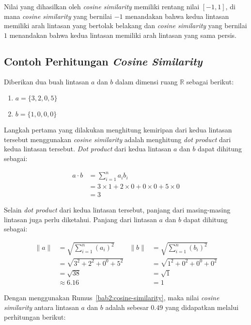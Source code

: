 Nilai yang dihasilkan oleh \textit{cosine similarity} memiliki rentang nilai $[-1, 1]$, di mana \textit{cosine similarity} yang bernilai $-1$ menandakan bahwa kedua lintasan memiliki arah lintasan yang bertolak belakang dan \textit{cosine similarity} yang bernilai $1$ menandakan bahwa kedua lintasan memiliki arah lintasan yang sama persis.

\subsection{Contoh Perhitungan \textit{Cosine Similarity}}
\label{subsec:contoh-cosine}

Diberikan dua buah lintasan $a$ dan $b$ dalam dimensi ruang $\mathbb{R}$ sebagai berikut:

\begin{enumerate}
    \item $a = \{ 3, 2, 0, 5 \}$
    \item $b = \{ 1, 0, 0, 0 \}$
\end{enumerate}

Langkah pertama yang dilakukan menghitung kemiripan dari kedua lintasan tersebut menggunakan \textit{cosine similarity} adalah menghitung \textit{dot product} dari kedua lintasan tersebut. \textit{Dot product} dari kedua lintasan $a$ dan $b$ dapat dihitung sebagai:

\begin{align*}
    a \cdot b & =  \sum_{i=1}^{n}{a_i b_i} \\
    & = 3 \times 1 + 2 \times 0 + 0 \times 0 + 5 \times 0 \\
    & = 3
\end{align*}

Selain \textit{dot product} dari kedua lintasan tersebut, panjang dari masing-masing lintasan juga perlu diketahui. Panjang dari lintasan $a$ dan $b$ dapat dihitung sebagai:

\begin{align*}
    \|a\| & = \sqrt{\sum_{i=1}^{n}{(a_i)^2}} & \|b\| & = \sqrt{\sum_{i=1}^{n}{(b_i)^2}} \\
    & = \sqrt{3^2 + 2^2 + 0^0 + 5^2} & & = \sqrt{1^2 + 0^2 + 0^0 + 0^2}  \\
    & = \sqrt{38} & & = \sqrt{1} \\
    & \approx 6.16 & & = 1
\end{align*}

Dengan menggunakan Rumus~\ref{bab2:cosine-similarity}, maka nilai \textit{cosine similarity} antara lintasan $a$ dan $b$ adalah sebesar $0.49$ yang didapatkan melalui perhitungan berikut:

